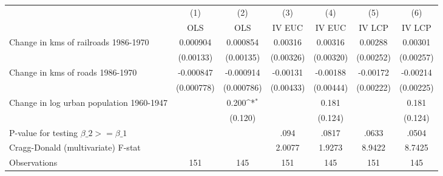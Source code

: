{
\def\sym#1{\ifmmode^{#1}\else\(^{#1}\)\fi}
\begin{tabular}{l*{6}{c}}
\hline\hline
                &\multicolumn{1}{c}{(1)}&\multicolumn{1}{c}{(2)}&\multicolumn{1}{c}{(3)}&\multicolumn{1}{c}{(4)}&\multicolumn{1}{c}{(5)}&\multicolumn{1}{c}{(6)}\\
                &\multicolumn{1}{c}{OLS}&\multicolumn{1}{c}{OLS}&\multicolumn{1}{c}{IV EUC}&\multicolumn{1}{c}{IV EUC}&\multicolumn{1}{c}{IV LCP}&\multicolumn{1}{c}{IV LCP}\\
\hline
Change in kms of railroads 1986-1970& 0.000904         & 0.000854         &  0.00316         &  0.00316         &  0.00288         &  0.00301         \\
                &(0.00133)         &(0.00135)         &(0.00326)         &(0.00320)         &(0.00252)         &(0.00257)         \\
[1em]
Change in kms of roads 1986-1970&-0.000847         &-0.000914         & -0.00131         & -0.00188         & -0.00172         & -0.00214         \\
                &(0.000778)         &(0.000786)         &(0.00433)         &(0.00444)         &(0.00222)         &(0.00225)         \\
[1em]
Change in log urban population 1960-1947&                  &    0.200\sym{*}  &                  &    0.181         &                  &    0.181         \\
                &                  &  (0.120)         &                  &  (0.124)         &                  &  (0.124)         \\
\hline
P-value for testing $\beta\_{2} >= \beta\_{1}$&                  &                  &     .094         &    .0817         &    .0633         &    .0504         \\
Cragg-Donald (multivariate) F-stat&                  &                  &   2.0077         &   1.9273         &   8.9422         &   8.7425         \\
Observations    &      151         &      145         &      151         &      145         &      151         &      145         \\
\hline\hline
\end{tabular}
}
